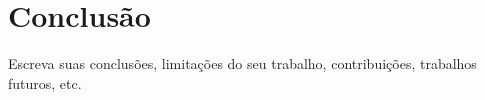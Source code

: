 \chapter[Conclusão]{Conclusão}
\label{ch:cap6}

Escreva suas conclusões, limitações do seu trabalho, contribuições, trabalhos futuros, etc.